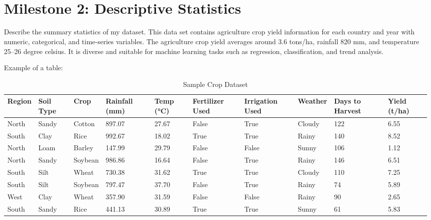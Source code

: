 \documentclass[12pt,a4paper]{article}
\begin{document}
\\\newline
\\\newline
\section{Milestone 2: Descriptive Statistics}
Describe the summary statistics of my dataset. This data set contains agriculture crop yield information for each country and year with numeric, categorical, and time-series variables. The agriculture crop yield averages around 3.6 tons/ha, rainfall 820 mm, and temperature 25–26 degree celsius. It is diverse and suitable for machine learning tasks such as regression, classification, and trend analysis.

Example of a table:

\begin{table}[h!]
\centering
\scriptsize
\setlength{\tabcolsep}{4pt}
\renewcommand{\arraystretch}{1.1}
\caption{Sample Crop Dataset}
\begin{tabularx}{\textwidth}{|X|X|X|X|X|X|X|X|X|X|}
\hline
\textbf{Region} & \textbf{Soil Type} & \textbf{Crop} & \textbf{Rainfall (mm)} & \textbf{Temp (°C)} & \textbf{Fertilizer Used} & \textbf{Irrigation Used} & \textbf{Weather} & \textbf{Days to Harvest} & \textbf{Yield (t/ha)} \\ 
\hline
North & Sandy & Cotton & 897.07 & 27.67 & False & True & Cloudy & 122 & 6.55 \\ 
\hline
South & Clay & Rice & 992.67 & 18.02 & True & True & Rainy & 140 & 8.52 \\ 
\hline
North & Loam & Barley & 147.99 & 29.79 & False & False & Sunny & 106 & 1.12 \\ 
\hline
North & Sandy & Soybean & 986.86 & 16.64 & False & True & Rainy & 146 & 6.51 \\ 
\hline
South & Silt & Wheat & 730.38 & 31.62 & True & True & Cloudy & 110 & 7.25 \\ 
\hline
South & Silt & Soybean & 797.47 & 37.70 & False & True & Rainy & 74 & 5.89 \\ 
\hline
West & Clay & Wheat & 357.90 & 31.59 & False & False & Rainy & 90 & 2.65 \\ 
\hline
South & Sandy & Rice & 441.13 & 30.89 & True & True & Sunny & 61 & 5.83 \\ 
\hline
\end{tabularx}
\end{table}
\end{document}
